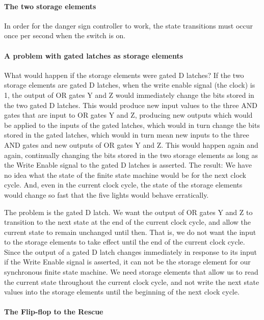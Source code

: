 \documentclass{patt}
\begin{document}
\FloatBarrier

\paragraph{The two storage elements}

In order for the danger sign controller to work, the state transitions must
occur once per second when the switch is on.

\paragraph{A problem with gated latches as storage elements}

What would happen if the storage elements were gated D latches?  
If the two storage elements are gated D latches, when the write enable signal
(the clock) is 1, the output of OR gates Y and Z would immediately change 
the bits stored in the two gated D latches.  This would produce new input 
values to the three AND gates that are input to OR gates Y and Z, producing 
new outputs which would be applied to the inputs of the gated latches, which 
would in turn change the bits stored in the gated latches, which would in turn 
mean new inputs to the three AND gates and new outputs of OR gates Y and Z.  
This would happen again and again, continually changing the bits stored in 
the two storage elements as long as the Write Enable signal to the gated D 
latches is asserted.  The result: We have no idea what the state of the finite 
state machine would be for the next clock cycle.  And, even in the current 
clock cycle, the state of the storage elements would change so fast that the 
five lights would behave erratically. 

The problem is the gated D latch.  We want the output of OR gates Y and Z
to transition to the next state at the end of the current clock cycle, and 
allow the current state to remain unchanged until then.  That is, we do
not want the input to the storage elements to take effect until the end of the
current clock cycle.  Since the output of a gated D latch changes immediately
in response to its input if the Write Enable signal is asserted, it can not be 
the storage element for our synchronous finite state machine.  We need storage 
elements that allow us to read the current state throughout the current clock
cycle, and not write the next state values into the storage elements until 
the beginning of the next clock cycle.  

\paragraph{The Flip-flop to the Rescue}
\end{document}
